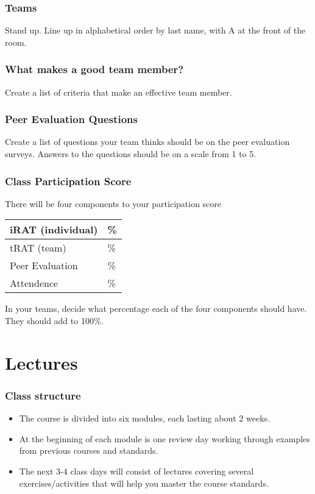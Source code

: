 \documentclass{beamer}
\begin{document}
{  \begin{frame}\frametitle{Teams}
  Stand up.  Line up in alphabetical order by last name, with A at the front of the room.
  \vspace{4in}
  \end{frame}

  \begin{frame} \frametitle{What makes a good team member?}
  Create a list of criteria that make an effective team member.
  \vspace{4in}
  \end{frame}

  \begin{frame} \frametitle{Peer Evaluation Questions}
  Create a list of questions your team thinks should be on the peer evaluation surveys.  Answers to the questions should be on a scale from 1 to 5.
  \vspace{4in}
  \end{frame}

  \begin{frame} \frametitle{Class Participation Score}
  There will be four components to your participation score

  \begin{center}
  \begin{tabular}{l|l}
  \hline
  iRAT (individual) & \phantom{xxxx}\%   \\ \hline
  tRAT (team) & \phantom{xxxx}\%   \\ \hline
  Peer Evaluation & \phantom{xxxx}\%   \\ \hline
  Attendence & \phantom{xxxx}\%   \\ \hline
  \end{tabular}
  \end{center}


  In your teams, decide what percentage each of the four components should have.  They should add to 100\%.
  \end{frame}
}{
  \section{Lectures}
  \begin{frame} \frametitle{Class structure}
  \begin{itemize}
  \item The course is divided into six modules, each lasting about 2 weeks.
  \item At the beginning of each module is one review day working through
        examples from previous courses and standards.
  \item The next 3-4 class days will consist of lectures covering several
        exercises/activities that will help you master the course standards.
  \end{itemize}
  \end{frame}
}
\end{document}

